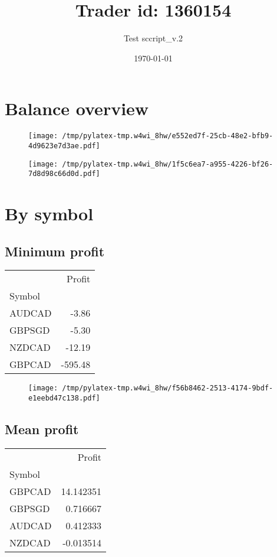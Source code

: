 \documentclass{article}%
\title{Trader id: 1360154}%
\author{Test sccript\_v.2}%
\date{\today}%
\begin{document}
%
\normalsize%
\maketitle%
\section{Balance overview}%
\label{sec:Balanceoverview}%


\begin{figure}[htbp]%
\centering%
\texttt{[image: /tmp/pylatex-tmp.w4wi\_8hw/e552ed7f-25cb-48e2-bfb9-4d9623e7d3ae.pdf]}%
\end{figure}

%


\begin{figure}[htbp]%
\centering%
\texttt{[image: /tmp/pylatex-tmp.w4wi\_8hw/1f5c6ea7-a955-4226-bf26-7d8d98c66d0d.pdf]}%
\end{figure}

%
\section{By symbol}%
\label{sec:Bysymbol}%
\subsection{Minimum profit }%
\label{subsec:Minimumprofit}%
\begin{tabular}{lr}
\toprule
{} &  Profit \\
Symbol &         \\
\midrule
AUDCAD &   -3.86 \\
GBPSGD &   -5.30 \\
NZDCAD &  -12.19 \\
GBPCAD & -595.48 \\
\bottomrule
\end{tabular}
%


\begin{figure}[htbp]%
\centering%
\texttt{[image: /tmp/pylatex-tmp.w4wi\_8hw/f56b8462-2513-4174-9bdf-e1eebd47c138.pdf]}%
\end{figure}

%
\newpage %
\subsection{Mean profit }%
\label{subsec:Meanprofit}%
\begin{tabular}{lr}
\toprule
{} &     Profit \\
Symbol &            \\
\midrule
GBPCAD &  14.142351 \\
GBPSGD &   0.716667 \\
AUDCAD &   0.412333 \\
NZDCAD &  -0.013514 \\
\bottomrule
\end{tabular}
%
\end{document}
